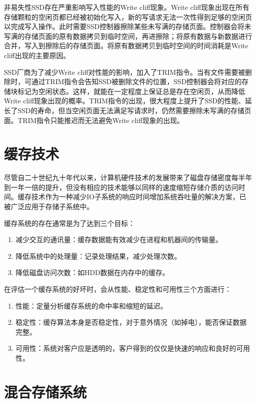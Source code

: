 \begin{enumerate}
非易失性SSD存在严重影响写入性能的Write cliff现象。Write cliff现象出现在所有存储颗粒的空闲页都已经被初始化写入，新的写请求无法一次性得到足够的空闲页以完成写入操作。此时需要SSD控制器擦除某些未写满的存储页面。控制器会将未写满的存储页面的原有数据拷贝到临时空间，再进擦除；将原有数据与新数据进行合并，写入到擦除后的存储页面。将原有数据拷贝到临时空间的时间消耗是Write cliff出现的主要原因。

SSD厂商为了减少Write cliff对性能的影响，加入了TRIM指令。当有文件需要被删除时，可通过TRIM指令会告知SSD被删除文件的位置，SSD控制器会将对应的存储块标记为空闲状态。这样，就能在一定程度上保证总是存在空闲页，从而降低Write cliff现象出现的概率。TRIM指令的出现，很大程度上提升了SSD的性能、延长了SSD的寿命，但当空闲页面无法满足写请求时，仍然需要擦除未写满的存储页面。TRIM指令只能推迟而无法避免Write cliff现象的出现。

\end{enumerate}

\section{缓存技术}
\label{sec:cache_tech}

尽管自二十世纪九十年代以来，计算机硬件技术的发展带来了磁盘存储密度每半年到一年一倍的提升，但没有相应的技术能够以同样的速度缩短存储介质的访问时间。缓存技术作为一种减少IO子系统的响应时间增加系统吞吐量的解决方案，已被广泛应用于存储子系统中。

缓存系统的存在通常是为了达到三个目标：
\begin{enumerate}
\item 减少交互的通讯量：缓存数据能有效减少在进程和机器间的传输量。
\item 降低系统中的处理量：记录处理结果，减少处理次数。
\item 降低磁盘访问次数：如HDD数据在内存中的缓存。
\end{enumerate}

在评估一个缓存系统的好坏时，会从性能、稳定性和可用性三个方面进行：
\begin{enumerate}
\item 性能：定量分析缓存系统的命中率和缩短的延迟。
\item 稳定性：缓存算法本身是否稳定性，对于意外情况（如掉电），能否保证数据完整。
\item 可用性：系统对客户应是透明的，客户得到的仅仅是快速的响应和良好的可用性。
\end{enumerate}

\section{混合存储系统}
\label{sec:hybrid_storage}

